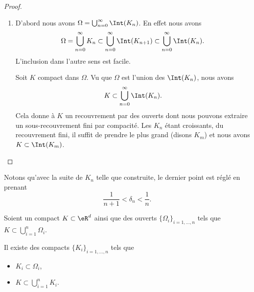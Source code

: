 \begin{proof}
\begin{enumerate}
		\item

		      D'abord nous avons \( \Omega=\bigcup_{n=0}^{\infty}\Int(K_n)\). En effet nous avons
		      \begin{equation}
			      \Omega=\bigcup_{n=0}^{\infty}K_n\subset\bigcup_{n=0}^{\infty}\Int(K_{n+1})\subset\bigcup_{n=0}^{\infty}\Int(K_n).
		      \end{equation}
		      L'inclusion dans l'autre sens est facile.

		      Soit \( K\) compact dans \( \Omega\). Vu que \( \Omega\) est l'union des \( \Int(K_n)\), nous avons
		      \begin{equation}
			      K\subset\bigcup_{n=0}^{\infty}\Int(K_n).
		      \end{equation}
		      Cela donne à \( K\) un recouvrement par des ouverts dont nous pouvons extraire un sous-recouvrement fini par compacité. Les \( K_n\) étant croissants, du recouvrement fini, il suffit de prendre le plus grand (disons \( K_m\)) et nous avons \( K\subset\Int(K_m)\).
	\end{enumerate}
\end{proof}
Notons qu'avec la suite de \( K_n\) telle que construite, le dernier point est réglé en prenant
\begin{equation}
	\frac{1}{ n+1 }<\delta_n<\frac{1}{ n }.
\end{equation}


\begin{lemma}     \label{LEMooWRIXooSBHavt}
	Soient un compact \( K\subset \eR^d\) ainsi que des ouverts \( \{\Omega_i\}_{i=1,\ldots, n}\) tels que \( K\subset\bigcup_{i=1}^n\Omega_i\).

	Il existe des compacts \( \{ K_i \}_{i=1,\ldots, n}\) tels que
	\begin{itemize}
		\item
		      \( K_i\subset \Omega_i\),
		\item
		      \( K\subset\bigcup_{i=1}^nK_i\).
	\end{itemize}
\end{lemma}

